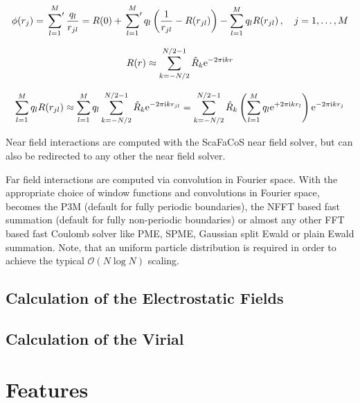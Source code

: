 \begin{equation*}
  \phi(r_j)
  =
  \sideset{}{^\prime}\sum_{l=1}^M
    \frac{q_l}{r_{jl}}
  =
  R(0) + \sideset{}{^\prime}\sum_{l=1}^M
    q_l \left( \frac{1}{r_{jl}} - R(r_{jl}) \right)
  - \sum_{l=1}^M
    q_l R(r_{jl})
  \,,\quad j=1,\hdots,M
\end{equation*}



\begin{equation*}
  R(r)
  \approx
    \sum_{k=-N/2}^{N/2-1} \hat R_k \mbox{\text{e}}^{-2\pi\mbox{\scriptsize\textrm{i}} kr}
\end{equation*}

\begin{equation*}
  \sum_{l=1}^M
    q_l R(r_{jl})
  \approx
  \sum_{l=1}^M q_l
    \sum_{k=-N/2}^{N/2-1} \hat R_k \mbox{\text{e}}^{-2\pi\mbox{\scriptsize\textrm{i}} kr_{jl}}
  =
  \sum_{k=-N/2}^{N/2-1} \hat R_k
    \left(
      \sum_{l=1}^M q_l \mbox{\text{e}}^{+2\pi\mbox{\scriptsize\textrm{i}} kr_l}
    \right)
    \mbox{\text{e}}^{-2\pi\mbox{\scriptsize\textrm{i}} kr_j}
\end{equation*}

Near field interactions are computed with the ScaFaCoS near field solver, but can also be redirected to any other the near field solver.

Far field interactions are computed via convolution in Fourier space.
With the appropriate choice of window functions and convolutions in Fourier space,
\ptwonfft becomes the P3M (default for fully periodic boundaries), the NFFT based fast summation (default for fully non-periodic boundaries)
or almost any other FFT based fast Coulomb solver like PME, SPME, Gaussian split Ewald or plain Ewald summation.
Note, that an uniform particle distribution is required in order to achieve the typical $\mathcal{O}(N\log N)$ scaling.

\subsection{Calculation of the Electrostatic Fields}

\subsection{Calculation of the Virial}






\newpage
\section{Features}

